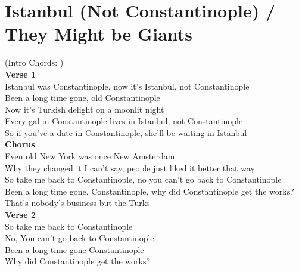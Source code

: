 \section{Istanbul (Not Constantinople) / They Might be Giants}\label{sec:istanbulnotconstantinople}
  
  \Aminor
  \Eseven
  \Dminor
  \BminorSeven
  \Eminor
  
(Intro Chords:          )\\
\textbf{Verse 1}\\
Istanbul was Constantinople, now it's Istanbul, not Constantinople\\
Been a long time gone, old Constantinople\\
Now it's Turkish delight on a moonlit night\\
Every gal in Constantinople lives in Istanbul, not Constantinople\\
So if you've a date in Constantinople, she'll be waiting in Istanbul\\
\textbf{Chorus}\\
Even old New York was once New Amsterdam\\
Why they changed it I can't say, people just liked it better that way\\
So take me back to Constantinople, no you can't go back to Constantinople\\
Been a long time gone,  Constantinople, why did Constantinople get the works?\\
That's nobody's business but the Turks\\
\textbf{Verse 2}                       \\
So take me back to Constantinople\\
No, You can't go back to Constantinople  \\      
Been a long time gone Constantinople\\
Why did Constantinople get the works?\\
